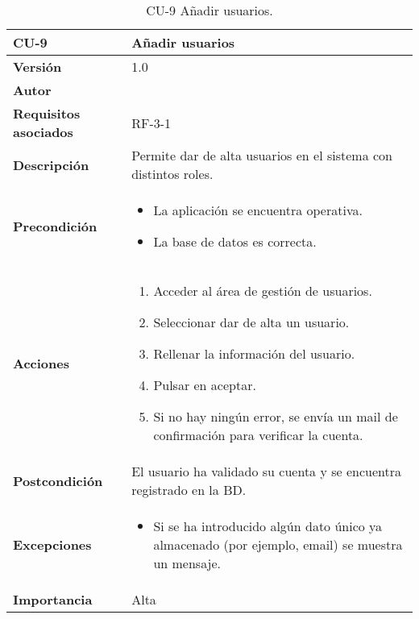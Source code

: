 \begin{table}[p]
	\centering
	\begin{tabularx}{\linewidth}{ p{} p{} }
		\toprule
		\textbf{CU-9}    & \textbf{ Añadir usuarios}\\
		\toprule
		\textbf{Versión}              & 1.0    \\
		\textbf{Autor}                & \@author{} \\
		\textbf{Requisitos asociados} & RF-3-1\\
		\textbf{Descripción}          & Permite dar de alta usuarios en el sistema con distintos roles. \\
		\textbf{Precondición}         &
		\begin{itemize}
			\tightlist
			\item La aplicación se encuentra operativa.
			\item La base de datos es correcta.
		\end{itemize}\\
		\textbf{Acciones}             &
		\begin{enumerate}
			\tightlist
			\item Acceder al área de gestión de usuarios.
			\item Seleccionar dar de alta un usuario.
			\item Rellenar la información del usuario.
			\item Pulsar en aceptar.
			\item Si no hay ningún error, se envía un mail de confirmación para verificar la cuenta.
		\end{enumerate}\\
		\textbf{Postcondición}        & El usuario ha validado su cuenta y se encuentra registrado en la BD.\\
		\textbf{Excepciones}          &
		\begin{itemize}
			\tightlist
			\item Si se ha introducido algún dato único ya almacenado (por ejemplo, email) se muestra un mensaje.
		\end{itemize}\\
		\textbf{Importancia}          & Alta\\
		\bottomrule
	\end{tabularx}
	\caption{CU-9 Añadir usuarios.}\label{tab:table-9}
\end{table}

